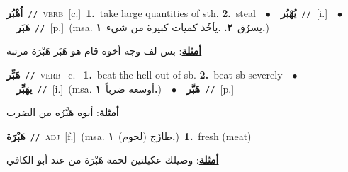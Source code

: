 \documentclass[10pt,a4paper,twoside]{article} %
\begin{document}
\begin{multicols}{2}
{{{\setlength\topsep{0pt}\textbf{\foreignlanguage{arabic}{اُهْبُر}}\ {\color{gray}\texttt{//}\color{black}}\ \textsc{verb}\ [c.]\ \textbf{1.}~take large quantities of sth.  \textbf{2.}~steal\ \ $\bullet$\ \ \setlength\topsep{0pt}\textbf{\foreignlanguage{arabic}{يُهْبُر}}\ {\color{gray}\texttt{//}\color{black}}\ [i.]\ \ $\bullet$\ \ \setlength\topsep{0pt}\textbf{\foreignlanguage{arabic}{هَبَر}}\ {\color{gray}\texttt{//}\color{black}}\ [p.]\ \color{gray}(msa. \foreignlanguage{arabic}{يسرُق}~\foreignlanguage{arabic}{\textbf{٢.}}  .\foreignlanguage{arabic}{يأخُذ كميات كبيرة من شيء}~\foreignlanguage{arabic}{\textbf{١.}})\color{black}\  \begin{flushright}\color{gray}\foreignlanguage{arabic}{\textbf{\underline{\foreignlanguage{arabic}{أمثلة}}}: بس لف وجه أخوه قام هو هَبَر هَبْرَة مرتبة}\end{flushright}\color{black}} \vspace{2mm}

{\setlength\topsep{0pt}\textbf{\foreignlanguage{arabic}{هَبِّر}}\ {\color{gray}\texttt{//}\color{black}}\ \textsc{verb}\ [c.]\ \textbf{1.}~beat the hell out of sb.  \textbf{2.}~beat sb severely\ \ $\bullet$\ \ \setlength\topsep{0pt}\textbf{\foreignlanguage{arabic}{يهَبِّر}}\ {\color{gray}\texttt{//}\color{black}}\ [i.]\ \color{gray}(msa. \foreignlanguage{arabic}{أوسعه ضرباً}~\foreignlanguage{arabic}{\textbf{١.}})\color{black}\ \ $\bullet$\ \ \setlength\topsep{0pt}\textbf{\foreignlanguage{arabic}{هَبَّر}}\ {\color{gray}\texttt{//}\color{black}}\ [p.]\  \begin{flushright}\color{gray}\foreignlanguage{arabic}{\textbf{\underline{\foreignlanguage{arabic}{أمثلة}}}: أبوه هَبَّرُه من الضرب}\end{flushright}\color{black}} \vspace{2mm}

{\setlength\topsep{0pt}\textbf{\foreignlanguage{arabic}{هَبْرَة}}\ {\color{gray}\texttt{//}\color{black}}\ \textsc{adj}\ [f.]\ \color{gray}(msa. \foreignlanguage{arabic}{طازَج (لحوم)}~\foreignlanguage{arabic}{\textbf{١.}})\color{black}\ \textbf{1.}~fresh (meat)\  \begin{flushright}\color{gray}\foreignlanguage{arabic}{\textbf{\underline{\foreignlanguage{arabic}{أمثلة}}}: وصيلك عكيلتين لحمة هَبْرَة من عند أبو الكافي}\end{flushright}\color{black}} \vspace{2mm}

}}
\end{multicols}
\end{document}
